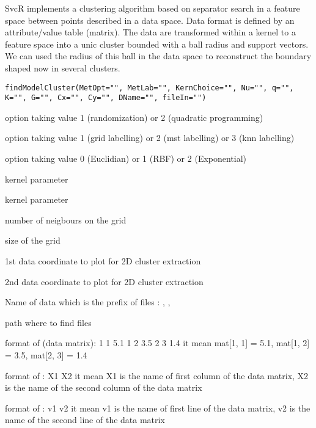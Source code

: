 \documentclass{article}
\begin{document}
\begin{Description}\relax
SvcR implements a clustering algorithm based on separator search in a feature 
space between points described in a data space. Data format is defined by 
an attribute/value table (matrix). The data are transformed within a kernel 
to a feature space into a unic cluster bounded with a ball radius and support vectors. 
We can used the radius of this ball in the data space 
to reconstruct the boundary shaped now in several clusters.
\end{Description}
\begin{Usage}
\begin{verbatim}
findModelCluster(MetOpt="", MetLab="", KernChoice="", Nu="", q="", K="", G="", Cx="", Cy="", DName="", fileIn="")
\end{verbatim}
\end{Usage}
\begin{Arguments}
\begin{ldescription}
\item[\code{MetOpt}] option taking value 1 (randomization) or 2 (quadratic programming) 
\item[\code{MetLab}] option taking value 1 (grid labelling) or 2 (mst labelling) or 3 (knn labelling) 
\item[\code{KernChoice}] option taking value 0 (Euclidian) or 1 (RBF) or 2 (Exponential) 
\item[\code{Nu}] kernel parameter  
\item[\code{q}] kernel parameter 
\item[\code{K}] number of neigbours on the grid 
\item[\code{G}] size of the grid 
\item[\code{Cx}] 1st data coordinate to plot for 2D cluster extraction 
\item[\code{Cy}] 2nd data coordinate to plot for 2D cluster extraction 
\item[\code{DName}] Name of data which is the prefix of files :
, 
, 
\item[\code{fileIn}] path where to find files 
\end{ldescription}
\end{Arguments}
\begin{Details}\relax
format of  (data matrix): 
1 1 5.1       
1 2 3.5
2 3 1.4
it mean mat[1, 1] = 5.1, mat[1, 2] = 3.5, mat[2, 3] = 1.4

format of  : 
X1
X2
it mean X1 is the name of first column of the data matrix, X2 is the name of the second column of the data matrix

format of  : 
v1
v2
it mean v1 is the name of first line of the data matrix, v2 is the name of the second line of the data matrix
\end{Details}
\end{document}
